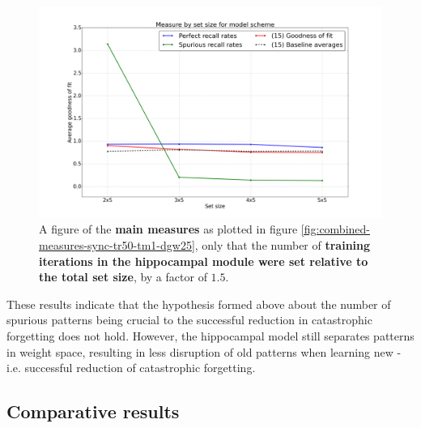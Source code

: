 \begin{figure}
    \centering
    \includegraphics[width=13cm]{fig/hypothesis-test-sync/combined-measures-sync-tm1-tr30-relative-iters}
    \caption{A figure of the \textbf{main measures} as plotted in figure \ref{fig:combined-measures-sync-tr50-tm1-dgw25}, only that the number of \textbf{training iterations in the hippocampal module were set relative to the total set size}, by a factor of $1.5$.}
    \label{fig:combined-measures-sync-tm1-tr30-relative-iters}
\end{figure}

These results indicate that the hypothesis formed above about the number of spurious patterns being crucial to the successful reduction in catastrophic forgetting does not hold. However, the hippocampal model still separates patterns in weight space, resulting in less disruption of old patterns when learning new - i.e. successful reduction of catastrophic forgetting.

\subsection{Comparative results}


